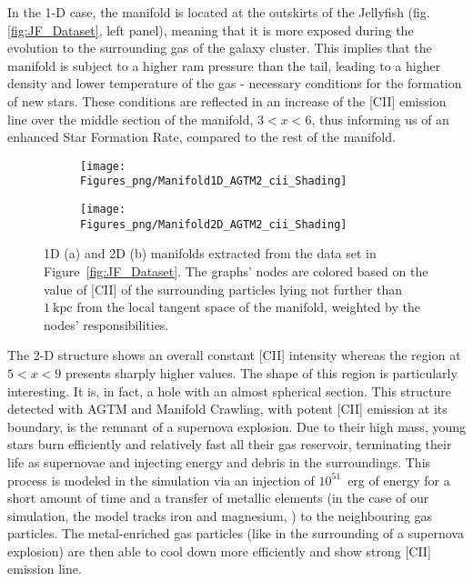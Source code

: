 In the 1-D case, the manifold is located at the outskirts of the Jellyfish (fig. \ref{fig:JF_Dataset}, left panel), meaning that it is more exposed during the evolution to the surrounding gas of the galaxy cluster. This implies that the manifold is subject to a higher ram pressure than the tail, leading to a higher density and lower temperature of the gas - necessary conditions for the formation of new stars. These conditions are reflected in an increase of the [CII] emission line over the middle section of the manifold, $3 < x < 6$, thus informing us of an enhanced Star Formation Rate, compared to the rest of the manifold.
\begin{figure}[ht]
\centering
\begin{subfigure}[t]{0.48\textwidth}
 \label{subfig:1dManGraph}
 \caption{}
 \texttt{[image: Figures\_png/Manifold1D\_AGTM2\_cii\_Shading]}
\end{subfigure}
\begin{subfigure}[t]{0.49\textwidth}
 \label{subfig:2dManGraph}
 \caption{}
 \texttt{[image: Figures\_png/Manifold2D\_AGTM2\_cii\_Shading]}
\end{subfigure}
\caption{1D (a) and 2D (b) manifolds extracted from the data set in Figure~\ref{fig:JF_Dataset}.
The graphs' nodes are colored based on the value of [CII] of the surrounding particles lying not further than $\mathrm{1~kpc}$ from the local tangent space of the manifold, weighted by the nodes' responsibilities.}
\label{fig:Man2D}
\end{figure}

The 2-D structure shows an overall constant [CII] intensity whereas the region at $5 < x < 9$ presents sharply higher values.
The shape of this region is particularly interesting. It is, in fact, a hole with an almost spherical section. This structure detected with AGTM and Manifold Crawling, with potent [CII] emission at its boundary, is the remnant of a supernova explosion. Due to their high mass, young stars burn efficiently and relatively fast all their gas reservoir, terminating their life as supernovae and injecting energy and debris in the surroundings.
This process is modeled in the simulation via an injection of $10^{51}$~erg of energy for a short amount of time and a transfer of metallic elements (in the case of our simulation, the model tracks iron and magnesium, \cite{DeRijcke2013}) to the neighbouring gas particles. The metal-enriched gas particles (like in the surrounding of a supernova explosion) are then able to cool down more efficiently and show strong [CII] emission line. 

